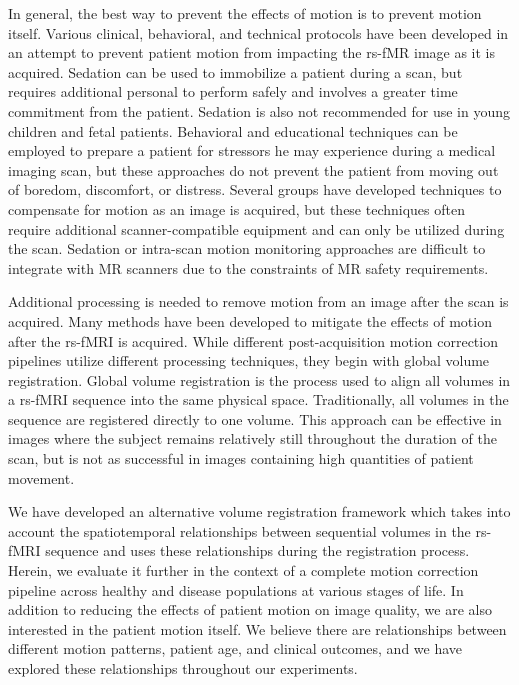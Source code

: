 In general, the best way to prevent the effects of motion is to prevent motion itself. Various clinical, behavioral, and technical protocols have been developed in an attempt to prevent patient motion from impacting the rs-fMR image as it is acquired. Sedation can be used to immobilize a patient during a scan, but requires additional personal to perform safely and involves a greater time commitment from the patient. Sedation is also not recommended for use in young children and fetal patients. Behavioral and educational techniques can be employed to prepare a patient for stressors he may experience during a medical imaging scan, but these approaches do not prevent the patient from moving out of boredom, discomfort, or distress. Several groups have developed techniques to compensate for motion as an image is acquired, but these techniques often require additional scanner-compatible equipment and can only be utilized during the scan. Sedation or intra-scan motion monitoring approaches are difficult to integrate with MR scanners due to the constraints of MR safety requirements. 

Additional processing is needed to remove motion from an image after the scan is acquired. Many methods have been developed to mitigate the effects of motion after the rs-fMRI is acquired. While different post-acquisition motion correction pipelines utilize different processing techniques, they begin with global volume registration. Global volume registration is the process used to align all volumes in a rs-fMRI sequence into the same physical space. Traditionally, all volumes in the sequence are registered directly to one volume. This approach can be effective in images where the subject remains relatively still throughout the duration of the scan, but is not as successful in images containing high quantities of patient movement.

We have developed an alternative volume registration framework which takes into account the spatiotemporal relationships between sequential volumes in the rs-fMRI sequence and uses these relationships during the registration process. Herein, we evaluate it further in the context of a complete motion correction pipeline across healthy and disease populations at various stages of life. In addition to reducing the effects of patient motion on image quality, we are also interested in the patient motion itself. We believe there are relationships between different motion patterns, patient age, and clinical outcomes, and we have explored these relationships throughout our experiments.

